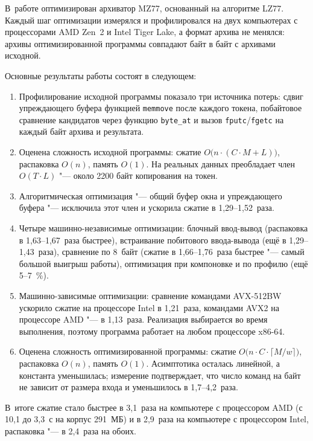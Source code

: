 
В~работе оптимизирован архиватор MZ77, основанный на алгоритме LZ77.
Каждый шаг оптимизации измерялся и профилировался на двух компьютерах с
процессорами AMD Zen~2 и Intel Tiger Lake, а формат архива не менялся:
архивы оптимизированной программы совпадают байт в байт с архивами
исходной.

Основные результаты работы состоят в следующем:
\begin{enumerate}
\item Профилирование исходной программы показало три источника потерь:
сдвиг упреждающего буфера функцией \texttt{memmove} после каждого токена,
побайтовое сравнение кандидатов через функцию \texttt{byte\_at} и вызов
\texttt{fputc}/\texttt{fgetc} на каждый байт архива и результата.
\item Оценена сложность исходной программы: сжатие
$O\bigl(n \cdot (C \cdot M + L)\bigr)$, распаковка $O(n)$, память $O(1)$.
На реальных данных преобладает член $O(T \cdot L)$ "--- около 2200 байт
копирования на токен.
\item Алгоритмическая оптимизация "--- общий буфер окна и упреждающего
буфера "--- исключила этот член и ускорила сжатие в 1,29--1,52~раза.
\item Четыре машинно-независимые оптимизации: блочный ввод-вывод
(распаковка в 1,63--1,67~раза быстрее), встраивание побитового
ввода-вывода (ещё в 1,29--1,43~раза), сравнение по 8~байт (сжатие в
1,66--1,76~раза быстрее "--- самый большой выигрыш работы), оптимизация при
компоновке и по профилю (ещё 5--7~\%).
\item Машинно-зависимые оптимизации: сравнение командами AVX-512BW
ускорило сжатие на процессоре Intel в 1,21~раза, командами AVX2 на
процессоре AMD "--- в 1,13~раза. Реализация выбирается во время выполнения,
поэтому программа работает на любом процессоре x86-64.
\item Оценена сложность оптимизированной программы: сжатие
$O\bigl(n \cdot C \cdot \lceil M/w \rceil\bigr)$, распаковка $O(n)$,
память $O(1)$. Асимптотика осталась линейной, а константа уменьшилась;
измерение подтверждает, что число команд на байт не зависит от размера
входа и уменьшилось в 1,7--4,2~раза.
\end{enumerate}

В~итоге сжатие стало быстрее в 3,1~раза на компьютере с процессором AMD
(с 10,1 до 3,3~с на корпус 291~МБ) и в 2,9~раза на компьютере с
процессором Intel, распаковка "--- в 2,4~раза на обоих.

